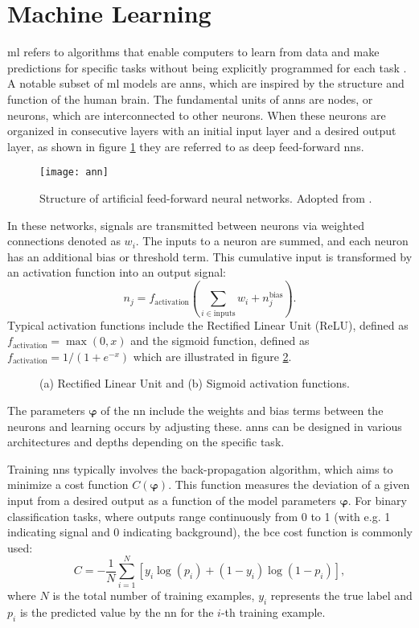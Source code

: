 \section{Machine Learning}\ac{ml} refers to algorithms that enable computers to learn from data and make predictions for specific tasks without being explicitly programmed for each task \citep{kubat2021introduction}. A notable subset of \ac{ml} models are \acp{ann}, which are inspired by the structure and function of the human brain. The fundamental units of \acp{ann} are nodes, or neurons, which are interconnected to other neurons. When these neurons are organized in consecutive layers with an initial input layer and a desired output layer, as shown in figure \ref{fig:ann} they are referred to as deep feed-forward \acp{nn}.
\begin{figure}
    \centering
    \texttt{[image: ann]}
    \caption[]{Structure of artificial feed-forward neural networks. Adopted from \citep{8114708}.}
    \label{fig:ann}
\end{figure}
In these networks, signals are transmitted between neurons via weighted connections denoted as $w_i$. The inputs to a neuron are summed, and each neuron has an additional bias or threshold term. This cumulative input is transformed by an activation function into an output signal:
\begin{equation}
    n_j=f_\text{activation} \left( \sum_{i\in \text{inputs}} w_i + n_j^\text{bias}\right).
\end{equation}
Typical activation functions include the Rectified Linear Unit (ReLU), defined as $f_\text{activation}=\max(0,x)$ and the sigmoid function, defined as  $f_\text{activation}=1/(1+e^{-x})$ which are illustrated in figure \ref{fig:activation_fun}.
\begin{figure}
    \centering
    \caption[]{(a) Rectified Linear Unit and (b) Sigmoid activation functions.}
    \label{fig:activation_fun}
\end{figure}
The parameters $\bm{\varphi}$ of the \ac{nn} include the weights and bias terms between the neurons and learning occurs by adjusting these. \acp{ann} can be designed in various architectures and depths depending on the specific task.

Training \acp{nn} typically involves the back-propagation algorithm, which aims to minimize a cost  function $C(\bm{\varphi})$. This function measures the deviation of a given input from a desired output as a function of the model parameters $\bm{\varphi}$. For binary classification tasks, where outputs range continuously from 0 to 1 (with e.g. 1 indicating signal and 0 indicating background), the \ac{bce} cost function is commonly used:
\begin{equation}\label{eq
    }
    C = -\frac{1}{N} \sum_{i=1}^{N} \left[ y_i \log(p_i) + (1 - y_i) \log(1 - p_i) \right],
\end{equation}
where $N$ is the total number of training examples, $y_i$ represents the true label and $p_i$ is the predicted value by the \ac{nn} for the $i$-th training example.

